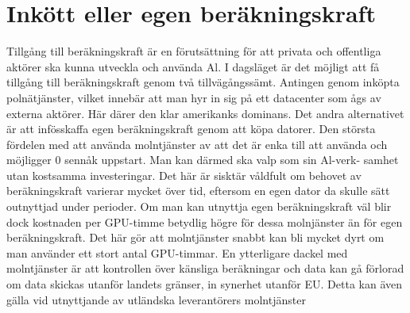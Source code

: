 {{{{{{{{{{{{{\section*{Inkött eller egen beräkningskraft}
Tillgång till beräkningskraft är en förutsättning för att privata och offentliga aktörer ska kunna utveckla och använda Al. I dagsläget är det möjligt att få tillgång till beräkningskraft genom två tillvägångssämt. Antingen genom inköpta polnätjänster, vilket innebär att man hyr in sig på ett datacenter som ågs av externa aktörer. Här därer den klar amerikanks dominans. Det andra alternativet är att infösskaffa egen beräkningskraft genom att köpa datorer.
Den största fördelen med att använda molntjänster av att det är enka till att använda och möjligger 0 sennåk uppstart. Man kan därmed ska valp som sin Al-verk- samhet utan kostsamma investeringar. Det här är sisktär våldfult om behovet av beräkningskraft varierar mycket över tid, eftersom en egen dator da skulle sätt outnyttjad under perioder. Om man kan utnyttja egen beräkningskraft väl blir dock kostnaden per GPU-timme betydlig högre för dessa molnjänster än för egen beräkningskraft.
Det här gör att molntjänster snabbt kan bli mycket dyrt om man använder ett stort antal GPU-timmar.
En ytterligare dackel med molntjänster är att kontrollen över känsliga beräkningar och data kan gå förlorad om data skickas utanför landets gränser, in synerhet utanför EU. Detta kan även gälla vid utnyttjande av utländska leverantörers molntjänster

}}}}}}}}}}}}}
